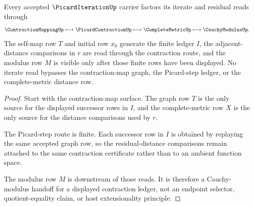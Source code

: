\begin{theorem}
\label{thm:picard-iteration-contraction-route}
Every accepted $\PicardIterationUp$ carrier factors its iterate and residual reads through
$$
\ContractionMappingUp \longmapsto \PicardContractionUp \longmapsto \CompleteMetricUp \longmapsto \CauchyModulusUp .
$$
The self-map row $T$ and initial row $x_0$ generate the finite ledger $I$, the adjacent-distance comparisons in $r$ are read through the contraction route, and the modulus row $M$ is visible only after those finite rows have been displayed. No iterate read bypasses the contraction-map graph, the Picard-step ledger, or the complete-metric distance row.
\end{theorem}
\begin{proof}
Start with the contraction-map surface. The graph row $T$ is the only source for the displayed successor rows in $I$, and the complete-metric row $X$ is the only source for the distance comparisons used by $r$.

The Picard-step route is finite. Each successor row in $I$ is obtained by replaying the same accepted graph row, so the residual-distance comparisons remain attached to the same contraction certificate rather than to an ambient function space.

The modulus row $M$ is downstream of those reads. It is therefore a Cauchy-modulus handoff for a displayed contraction ledger, not an endpoint selector, quotient-equality claim, or host extensionality principle.
\end{proof}

